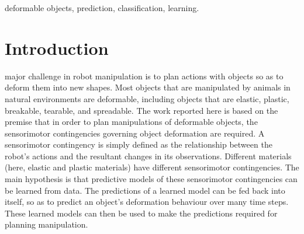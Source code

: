 \documentclass[journal]{IEEEtran}
\begin{document}
\begin{IEEEkeywords}
deformable objects, prediction, classification, learning.
\end{IEEEkeywords}

%
\IEEEpeerreviewmaketitle



\section{Introduction}
% 
% 
% 
% 
 major challenge in robot manipulation is to plan actions with objects so as to deform them into new shapes. Most objects that are manipulated by animals in natural environments are deformable, including objects that are elastic, plastic, breakable, tearable, and spreadable. The work reported here is based on the premise that in order to plan manipulations of deformable objects, the sensorimotor contingencies governing object deformation are required. A sensorimotor contingency is simply defined as the relationship between the robot's actions and the resultant changes in its observations. Different materials (here, elastic and plastic materials) have different sensorimotor contingencies. The main hypothesis is that predictive models of these sensorimotor contingencies can be learned from data. The predictions of a learned model can be fed back into itself, so as to predict an object's deformation behaviour over many time steps. These learned models can then be used to make the predictions required for planning manipulation.
\end{document}
